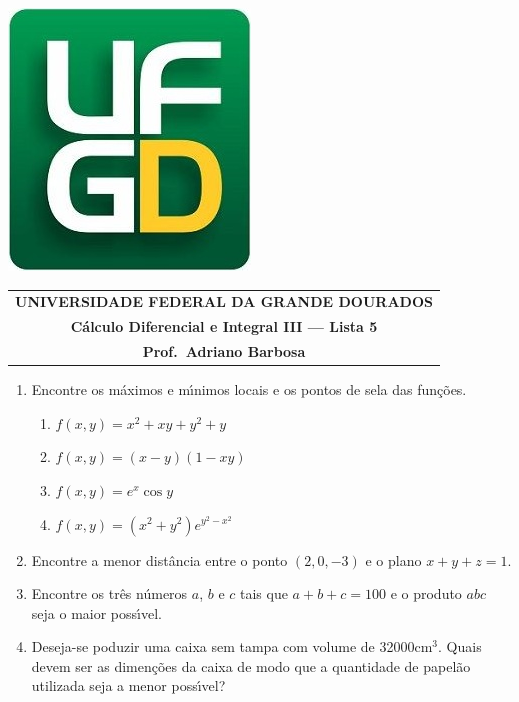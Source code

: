 \documentclass[a4paper,5pt]{amsbook}
\begin{document}
\thispagestyle{empty}
\pagestyle{empty}
\begin{minipage}[h]{0.14\textwidth}
	\includegraphics[scale=0.24]{../../ufgd.png}
\end{minipage}
\begin{minipage}[h]{\textwidth}
\begin{tabular}{c}
{{\bf UNIVERSIDADE FEDERAL DA GRANDE DOURADOS}}\\
{{\bf C\'alculo Diferencial e Integral III --- Lista 5}}\\
{{\bf Prof.\ Adriano Barbosa}}\\
\end{tabular}
\vspace{-0.45cm}
%
\end{minipage}


\vspace{1cm}
\begin{enumerate}
    \setlength\itemsep{0.5cm}
    \item Encontre os m\'aximos e m\'{\i}nimos locais e os pontos de sela das fun\c{c}\~oes.
        \begin{enumerate}
            \item $f(x,y) = x^2+xy+y^2+y$
            \item $f(x,y) = (x-y)(1-xy)$
            \item $f(x,y) = e^x \cos{y}$
            \item $f(x,y) = (x^2+y^2)e^{y^2-x^2}$
        \end{enumerate}

    \item Encontre a menor dist\^ancia entre o ponto $(2,0,-3)$ e o plano
    $x+y+z=1$.

    \item Encontre os tr\^es n\'umeros $a$, $b$ e $c$ tais que $a+b+c=100$ e o
    produto $abc$ seja o maior poss\'{\i}vel.

    \item Deseja-se poduzir uma caixa sem tampa com volume de 32000cm$^3$.
    Quais devem ser as dimen\c{c}\~oes da caixa de modo que a quantidade de papel\~ao
    utilizada seja a menor poss\'{\i}vel?
\end{enumerate}
\end{document}

